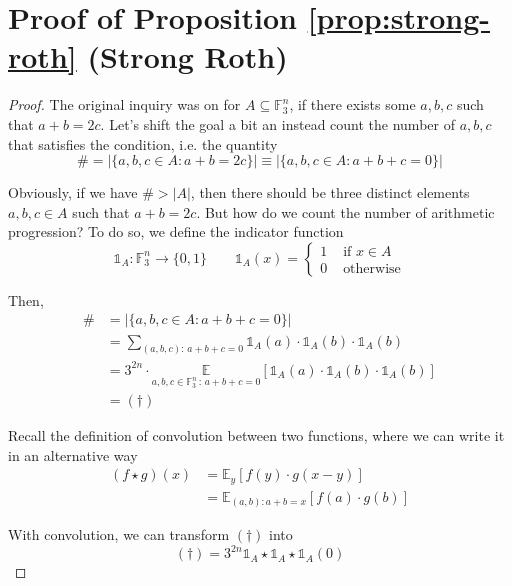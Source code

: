 \section{Proof of Proposition \ref{prop:strong-roth} (Strong Roth)}
\begin{proof}
    The original inquiry was on for $A \subseteq \mathbb F_3^n$, if there exists some $a, b, c$ such that $a + b = 2c$. Let's shift the goal a bit an instead count the number of $a, b, c$ that satisfies the condition, i.e. the quantity
    \begin{equation}
        \# = |\{a, b, c \in A : a + b = 2c \}| \equiv |\{a, b, c \in A : a + b + c = 0 \}|
    \end{equation}
    
    Obviously, if we have $\# > |A|$, then there should be three distinct elements $a, b, c \in A$ such that $a + b = 2c$. But how do we count the number of arithmetic progression? To do so, we define the indicator function 
    \begin{equation}
        \mathbb 1_A: \mathbb F_3^n \rightarrow \{0, 1\} \quad \quad \mathbb 1_A(x) = \begin{cases}
            1 & \text{ if } x \in A \\
            0 & \text{ otherwise} 
        \end{cases}
    \end{equation}
    
    Then, 
    \begin{align}
        \#
        &= |\{a, b, c \in A : a + b + c = 0 \}| \\
        &= \sum_{(a, b, c) :\, a + b + c = 0} \mathbb 1 _A(a) \cdot \mathbb 1 _A(b) \cdot \mathbb 1 _A(b) \\
        &= 3^{2n} \cdot \underset{{a, b, c \in \mathbb F_3^n \, : \, a + b + c = 0}}{\mathbb E} \left[ \mathbb 1 _A(a) \cdot \mathbb 1 _A(b) \cdot \mathbb 1 _A(b) \right]  \\
        &= (\dagger)
    \end{align}
    
    Recall the definition of convolution between two functions, where we can write it in an alternative way
    \begin{align}
        ( f\star g) (x) 
        &= \mathbb E_y [f(y) \cdot g(x - y) ] \\
        &= \mathbb E_{(a, b): a + b = x} [f(a) \cdot g(b)]
    \end{align}
    
    With convolution, we can transform $(\dagger)$ into
    \begin{equation}
        (\dagger) = 3^{2n} \mathbb 1 _A \star \mathbb 1 _A \star \mathbb 1 _A (0)
    \end{equation}
    

\end{proof}
